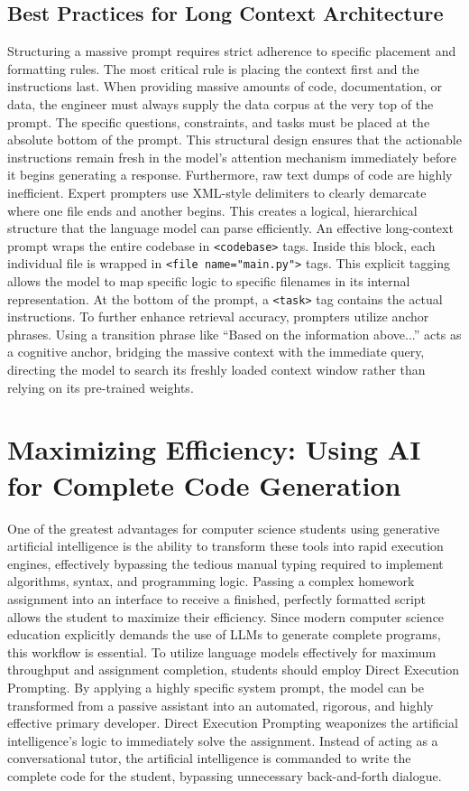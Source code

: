 \documentclass[12pt]{article}
\begin{document}
\subsection{Best Practices for Long Context Architecture}
Structuring a massive prompt requires strict adherence to specific placement and formatting rules. The most
critical rule is placing the context first and the instructions last. When providing massive amounts of code,
documentation, or data, the engineer must always supply the data corpus at the very top of the prompt. The
specific questions, constraints, and tasks must be placed at the absolute bottom of the prompt. This structural
design ensures that the actionable instructions remain fresh in the model's attention mechanism immediately
before it begins generating a response. Furthermore, raw text dumps of code are highly inefficient. Expert
prompters use XML-style delimiters to clearly demarcate where one file ends and another begins. This creates a
logical, hierarchical structure that the language model can parse efficiently. An effective long-context prompt
wraps the entire codebase in \texttt{<codebase>} tags. Inside this block, each individual file is wrapped in
\texttt{<file name="main.py">} tags. This explicit tagging allows the model to map specific logic to specific
filenames in its internal representation. At the bottom of the prompt, a \texttt{<task>} tag contains the
actual instructions. To further enhance retrieval accuracy, prompters utilize anchor phrases. Using a
transition phrase like ``Based on the information above...'' acts as a cognitive anchor, bridging the massive
context with the immediate query, directing the model to search its freshly loaded context window rather than
relying on its pre-trained weights.

\section{Maximizing Efficiency: Using AI for Complete Code Generation}
One of
the greatest advantages for computer science students using generative artificial intelligence is the ability
to transform these tools into rapid execution engines, effectively bypassing the tedious manual typing required
to implement algorithms, syntax, and programming logic. Passing a complex homework assignment into an interface
to receive a finished, perfectly formatted script allows the student to maximize their efficiency. Since modern
computer science education explicitly demands the use of LLMs to generate complete programs, this workflow is
essential. To utilize language models effectively for maximum throughput and assignment completion, students
should employ Direct Execution Prompting. By applying a highly specific system prompt, the model can be
transformed from a passive assistant into an automated, rigorous, and highly effective primary developer. Direct
Execution Prompting weaponizes the artificial intelligence's logic to immediately solve the assignment. Instead
of acting as a conversational tutor, the artificial intelligence is commanded to write the complete code for
the student, bypassing unnecessary back-and-forth dialogue.
\end{document}

